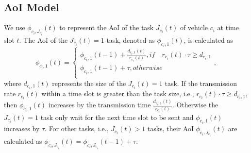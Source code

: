 \documentclass[lettersize,journal,onecolumn]{IEEEtran}
\begin{document}
\subsection{AoI Model}
We use ${{\phi }_{{{{c}}_{i}},{{J}_{{{{c}}_{i}}}}}}(t)$ to represent the AoI of the task ${{J}_{{{{c}}_{i}}}}(t)$ of vehicle ${{{c}}_{i}}$ at time slot $t$. The AoI of the ${{J}_{{{{c}}_{i}}}}(t)=1$ task, denoted as ${{\phi }_{{{{c}}_{i}},1}}(t)$, is calculated as
\begin{equation}
{{\phi }_{{{{c}}_{i}},1}}\left( t \right)=\left\{ \begin{matrix}
   {{\phi }_{{{{c}}_{i}},1}}\left( t-1 \right)+\frac{{{d}_{{{{c}}_{i}},1}}\left( t \right)}{{{r}_{{{{c}}_{i}}}}(t)},{if } \quad { {r}_{{{{c}}_{i}}}}(t)\cdot \tau \ge {{d}_{{{{c}}_{i}},1}}
    \\
   {{\phi }_{{{{c}}_{i}},1}}\left( t-1 \right)+\tau ,{ otherwise                             }  \\
\end{matrix} \right.
\label{eq7},
\end{equation}
where ${{d}_{{{{c}}_{i}},1}}\left( t \right)$ represents the size of the ${{J}_{{{{c}}_{i}}}}(t)=1$ task. If the transmission rate ${{r}_{{{{c}}_{i}}}}(t)$ within a time slot is greater than the task size, i.e., ${{r}_{{{{c}}_{i}}}}(t)\cdot \tau \ge {{d}_{{{{c}}_{i}},1}}$, then ${{\phi }_{{{{c}}_{i}},1}}(t)$ increases by the transmission time $\frac{{{d}_{{{{c}}_{i}},1}}\left( t \right)}{{{r}_{{{{c}}_{i}}}}(t)}$. Otherwise the ${{J}_{{{{c}}_{i}}}}(t)=1$ task only wait for the next time slot to be sent and ${{\phi }_{{{{c}}_{i}},1}}(t)$ increases by $\tau $. For other tasks, i.e., ${{J}_{{{{c}}_{i}}}}(t)>1$ tasks, their AoI ${{\phi }_{{{{c}}_{i}},{{J}_{{{{c}}_{i}}}}}}(t)$ are calculated as ${{\phi }_{{{{c}}_{i}},{{J}_{{{{c}}_{i}}}}}}(t)={{\phi }_{{{{c}}_{i}},{{J}_{{{{c}}_{i}}}}}}\left( t-1 \right)+\tau $.
\end{document}
